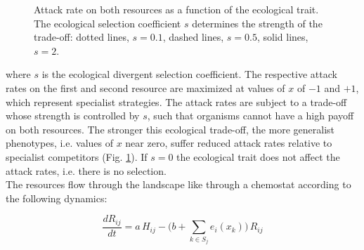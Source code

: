 \begin{figure}
    \begin{center}
        \end{center}
    \label{fig:attack_rates}
    \caption{Attack rate on both resources as a function of the ecological trait. The ecological selection coefficient $s$ determines the strength of the trade-off: dotted lines, $s = 0.1$, dashed lines, $s = 0.5$, solid lines, $s = 2$.}
\end{figure}

where $s$ is the ecological divergent selection coefficient. The respective attack rates on the first and second resource are maximized at values of $x$ of $-1$ and $+1$, which represent specialist strategies. The attack rates are subject to a trade-off whose strength is controlled by $s$, such that organisms cannot have a high payoff on both resources. The stronger this ecological trade-off, the more generalist phenotypes, i.e. values of $x$ near zero, suffer reduced attack rates relative to specialist competitors (Fig. \ref{fig:attack_rates}). If $s = 0$ the ecological trait does not affect the attack rates, i.e. there is no selection.\\

The resources flow through the landscape like through a chemostat according to the following dynamics:

\begin{equation}
    \frac{dR_{ij}}{dt} = a \, H_{ij} - \big(b + \sum_{k \in S_j} e_i(x_k) \big) \, R_{ij}
    \label{eq:resource_dynamics}
\end{equation}

